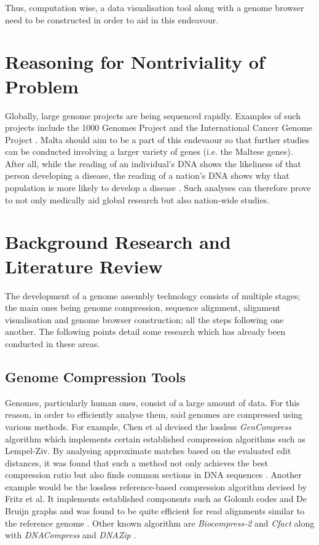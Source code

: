 \documentclass{csfyp}
\begin{document}
Thus, computation wise, a data visualisation tool along with a genome browser need to be constructed in order to aid in this endeavour.  


\section{Reasoning for Nontriviality of Problem}

Globally, large genome projects are being sequenced rapidly.  Examples of such projects include the 1000 Genomes Project and the International Cancer Genome Project \cite{bwtransform, refcompression, popgen}.  Malta should aim to be a part of this endevaour so that further studies can be conducted involving a larger variety of genes (i.e. the Maltese genes).  After all, while the reading of an individual's DNA shows the likeliness of that person developing a disease, the reading of a nation’s DNA shows why that population is more likely to develop a disease \cite{think}.  Such analyses can therefore prove to not only medically aid global research but also nation-wide studies.             


\section{Background Research and Literature Review}

The development of a genome assembly technology consists of multiple stages; the main ones being genome compression, sequence alignment, alignment visualisation and genome browser construction; all the steps following one another.  The following points detail some research which has already been conducted in these areas.

\subsection{Genome Compression Tools}
Genomes, particularly human ones, consist of a large amount of data.  For this reason, in order to efficiently analyse them, said genomes are compressed using various methods.  For example, Chen et al devised the lossless {\textit{GenCompress}} algorithm which implements certain established compression algorithms such as Lempel-Ziv.  By analysing approximate matches based on the evaluated edit distances, it was found that such a method not only achieves the best compression ratio but also finds common sections in DNA sequences \cite{gencompress}.  Another example would be the lossless reference-based compression algorithm devised by Fritz et al.  It implements established components such as Golomb codes and De Bruijn graphs and was found to be quite efficient for read alignments similar to the reference genome \cite{refcompression}.  Other known algorithm are {\textit{Biocompress-2}} and {\textit{Cfact}} \cite{gencompress} along with {\textit{DNACompress}} and {\textit{ DNAZip}} \cite{refcompression}.          
\end{document}
